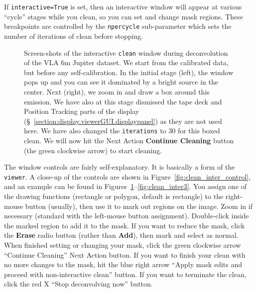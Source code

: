 If {\tt interactive=True} is set, then an interactive window
will appear at various ``cycle'' stages while you clean, so you
can set and change mask regions.  These breakpoints are controlled
by the {\tt npercycle} sub-parameter which sets the number of
iterations of clean before stopping.

\begin{figure}[h!]
\begin{center}
\caption{\label{fig:clean_inter1} Screen-shots of the interactive 
{\tt clean} window during deconvolution of the VLA 6m Jupiter
dataset.  We start from the calibrated data, but before any 
self-calibration. In the initial stage (left), the window pops up 
and you can see it dominated by a bright source in the center.
Next (right), we zoom in and draw a box around this emission.
We have also at this stage dismissed the tape deck and Position
Tracking parts of the display 
(\S~\ref{section:display.viewerGUI.displaypanel}) 
as they are not used here.  We have also changed the 
{\tt iterations} to 30 for this boxed clean.
We will now hit the Next Action {\bf Continue Cleaning} button 
(the green clockwise arrow) to start cleaning. } 
\hrulefill
\end{center}
\end{figure}

The window controls are fairly self-explanatory.  It is basically a
form of the {\tt viewer}.  A close-up of the controls are shown in
Figure~\ref{fig:clean_inter_control}, and an example can be found in 
Figures~\ref{fig:clean_inter1}--\ref{fig:clean_inter3}.  
You assign one of the drawing functions
(rectangle or polygon, default is rectangle) to the right-mouse button
(usually), then use it to mark out regions on the image.  Zoom in if
necessary (standard with the left-mouse button assignment).
Double-click inside the marked region to add it to the mask.  If you
want to reduce the mask, click the {\bf Erase} radio button (rather
than {\bf Add}), then mark and select as normal.  
When finished setting or changing your mask, click the green
clockwise arrow ``Continue Cleaning'' Next Action button.  
If you want to finish your clean with
no more changes to the mask, hit the blue right arrow 
``Apply mask edits and proceed with non-interactive clean''
button.  If you want to terminate the clean, click the red X
``Stop deconvolving now'' button.


